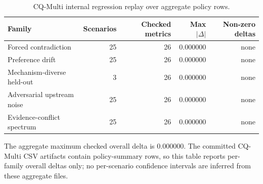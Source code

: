 \begin{table}[h]
\centering
\caption{CQ-Multi internal regression replay over aggregate policy rows.}
\label{tab:cqmulti-regression}
\small
\begin{tabular}{lrrrr}
\toprule
Family & Scenarios & Checked metrics & Max $|\Delta|$ & Non-zero deltas \\
\midrule
Forced contradiction & 25 & 26 & 0.000000 & none \\
Preference drift & 25 & 26 & 0.000000 & none \\
Mechanism-diverse held-out & 3 & 26 & 0.000000 & none \\
Adversarial upstream noise & 25 & 26 & 0.000000 & none \\
Evidence-conflict spectrum & 25 & 26 & 0.000000 & none \\
\bottomrule
\end{tabular}
\vspace{2pt}
\begin{minipage}{0.92\linewidth}
\footnotesize
The aggregate maximum checked overall delta is 0.000000. The committed CQ-Multi
CSV artifacts contain policy-summary rows, so this table reports per-family
overall deltas only; no per-scenario confidence intervals are inferred from
these aggregate files.
\end{minipage}
\end{table}
